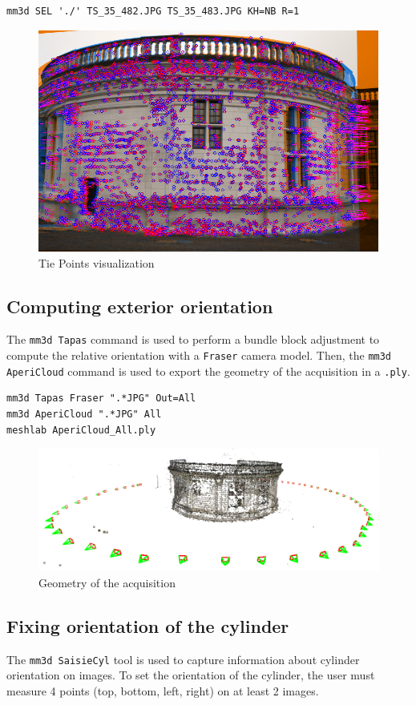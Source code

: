 \begin{verbatim}
mm3d SEL './' TS_35_482.JPG TS_35_483.JPG KH=NB R=1
\end{verbatim}

\begin{figure}[H]
    \begin{center}
    \setlength{\unitlength}{0.5cm}
    \includegraphics[width=0.4\linewidth]{FIGS/ChambordTower/sel_chambord_tower.png}
    \end{center}
    \caption{Tie Points visualization}
    \label{fig:sel}
\end{figure}

\subsection{Computing exterior orientation}
The {\tt mm3d Tapas} command is used to perform a bundle block adjustment to compute the relative orientation with a {\tt Fraser} camera model. Then, the {\tt mm3d AperiCloud} command is used to export the geometry of the acquisition in a {\tt .ply}.

\begin{verbatim}
mm3d Tapas Fraser ".*JPG" Out=All
mm3d AperiCloud ".*JPG" All
meshlab AperiCloud_All.ply
\end{verbatim}

\begin{figure}[H]
    \begin{center}
    \setlength{\unitlength}{0.5cm}
    \includegraphics[width=0.6\linewidth]{FIGS/ChambordTower/aero_chambord_tower.png}
    \end{center}
    \caption{Geometry of the acquisition}
    \label{fig:aero}
\end{figure}

\subsection{Fixing orientation of the cylinder}
The {\tt mm3d SaisieCyl} tool is used to capture information about cylinder orientation on images. To set the orientation of the cylinder, the user must measure 4 points (top, bottom, left, right) on at least 2 images.

